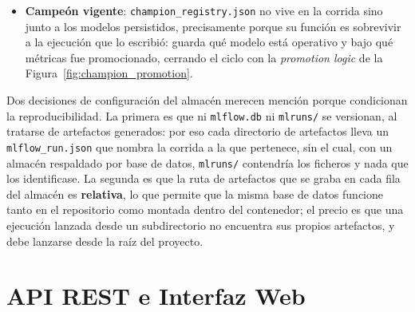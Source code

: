 \begin{itemize}
    calibrados y la cantidad de pedido), y es la base de \texttt{cost\_summary}. La diferencia
    de tamaño es de un factor $H$, de modo que recomputar el MAE publicado a partir del segundo
    daría un número distinto. Con ambos, cualquier métrica publicada es recomputable sin volver
    a entrenar. Junto a ellos,
    \texttt{fold\_}\allowbreak\texttt{metrics.csv},
    \texttt{promotion\_}\allowbreak\texttt{decision.json},
    \texttt{reorder\_}\allowbreak\texttt{recommendations.csv},
    \texttt{exceptions.csv} y \texttt{data\_}\allowbreak\texttt{quality\_}\allowbreak\texttt{report.json}
    registran el desglose por \textit{fold}, la decisión de promoción, el plan de reposición, las
    excepciones marcadas y las anomalías del panel de entrada. El informe de deriva
    (\texttt{drift\_}\allowbreak\texttt{report.json}) aparece solo cuando la corrida llegó a
    calcular valores de Shapley, que es lo que ordena las \textit{features} a vigilar; por eso la
    interfaz avisa de su ausencia en lugar de dibujar un panel vacío.
    \item \textbf{Campeón vigente}: \texttt{champion\_}\allowbreak\texttt{registry.json} no vive
    en la corrida sino junto a los modelos persistidos, precisamente porque su función es
    sobrevivir a la ejecución que lo escribió: guarda qué modelo está operativo y bajo qué
    métricas fue promocionado, cerrando el ciclo con la \textit{promotion logic} de la
    Figura~\ref{fig:champion_promotion}.
\end{itemize}

Dos decisiones de configuración del almacén merecen mención porque condicionan la
reproducibilidad. La primera es que ni \texttt{mlflow.db} ni \texttt{mlruns/} se versionan, al
tratarse de artefactos generados: por eso cada directorio de artefactos lleva un
\texttt{mlflow\_run.json} que nombra la corrida a la que pertenece, sin el cual, con un almacén
respaldado por base de datos, \texttt{mlruns/} contendría los ficheros y nada que los
identificase. La segunda es que la ruta de artefactos que se graba en cada fila del almacén es
\textbf{relativa}, lo que permite que la misma base de datos funcione tanto en el repositorio
como montada dentro del contenedor; el precio es que una ejecución lanzada desde un
subdirectorio no encuentra sus propios artefactos, y debe lanzarse desde la raíz del proyecto.

\section{API REST e Interfaz Web}
\label{sec:api}

